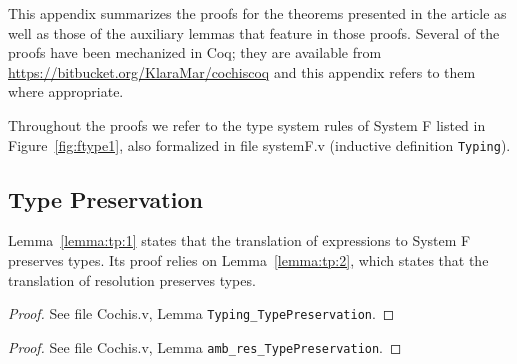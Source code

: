 This appendix summarizes the proofs for the theorems presented in the article
as well as those of the auxiliary lemmas that feature in those proofs.
Several of the proofs have been mechanized in Coq; they are available from
\url{https://bitbucket.org/KlaraMar/cochiscoq} and this appendix refers to 
them where appropriate.

Throughout the proofs we refer to the type system rules of System F listed
in Figure~\ref{fig:ftype1}, also formalized in file systemF.v (inductive
definition \texttt{Typing}).

\subsection{Type Preservation}\label{proof:preservation}

Lemma~\ref{lemma:tp:1} states that the translation of expressions to System F preserves
types. Its proof relies on Lemma~\ref{lemma:tp:2}, which states that the translation
of resolution preserves types.

{\centering
{}}
\begin{proof}
	See file Cochis.v, Lemma \texttt{Typing\_TypePreservation}.
\end{proof}

{\centering
{}}
\begin{proof}
	See file Cochis.v, Lemma \texttt{amb\_res\_TypePreservation}.
\end{proof}

